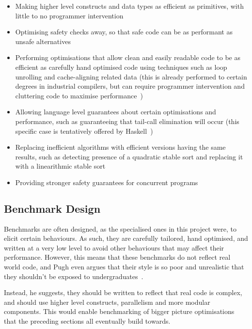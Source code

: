 \begin{itemize}
	\itemsep-0.25em
	\item Making higher level constructs and data types as efficient as primitives, with little to no programmer intervention
	\item Optimising safety checks away, so that safe code can be as performant as unsafe alternatives
	\item Performing optimisations that allow clean and easily readable code to be as efficient as carefully hand optimised code using techniques such as loop unrolling and cache-aligning related data (this is already performed to certain degrees in industrial compilers, but can require programmer intervention and cluttering code to maximise performance~\cite{gccloops})
	\item Allowing language level guarantees about certain optimisations and performance, such as guaranteeing that tail-call elimination will occur (this specific case is tentatively offered by Haskell~\cite{haskelltail})
	\item Replacing inefficient algorithms with efficient versions having the same results, such as detecting presence of a quadratic stable sort and replacing it with a linearithmic stable sort
	\item Providing stronger safety guarantees for concurrent programs
\end{itemize}

\subsection{Benchmark Design}

Benchmarks are often designed, as the specialised ones in this project were, to elicit certain behaviours. As such, they are carefully tailored, hand optimised, and written at a very low level to avoid other behaviours that may affect their performance. However, this means that these benchmarks do not reflect real world code, and Pugh even argues that their style is so poor and unrealistic that they shouldn't be exposed to undergraduates~\cite{optimisationrelevant}.

Instead, he suggests, they should be written to reflect that real code is complex, and should use higher level constructs, parallelism and more modular components. This would enable benchmarking of bigger picture optimisations that the preceding sections all eventually build towards.
